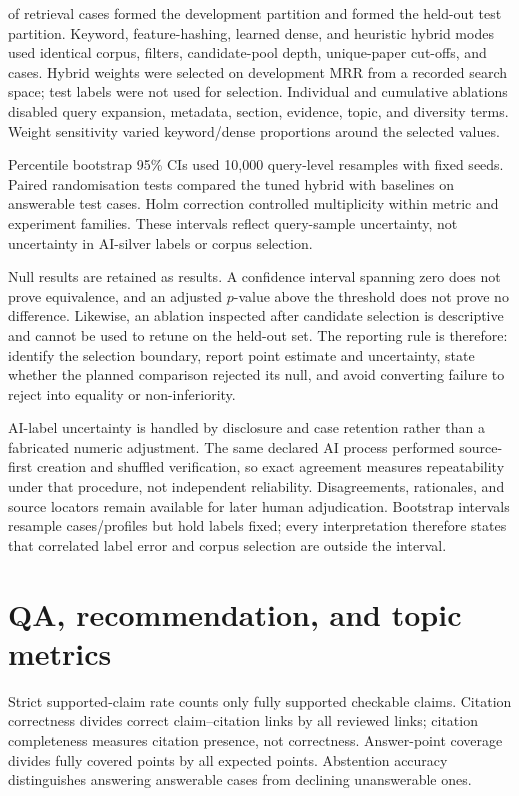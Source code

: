 \RetrievalDevCount{} of \RetrievalCaseCount{} retrieval cases formed the development partition and \RetrievalTestCount{} formed the held-out test partition. Keyword, feature-hashing, learned dense, and heuristic hybrid modes used identical corpus, filters, candidate-pool depth, unique-paper cut-offs, and cases. Hybrid weights were selected on development MRR from a recorded search space; test labels were not used for selection. Individual and cumulative ablations disabled query expansion, metadata, section, evidence, topic, and diversity terms. Weight sensitivity varied keyword/dense proportions around the selected values.

Percentile bootstrap 95\% CIs used 10,000 query-level resamples with fixed seeds. Paired randomisation tests compared the tuned hybrid with baselines on answerable test cases. Holm correction controlled multiplicity within metric and experiment families. These intervals reflect query-sample uncertainty, not uncertainty in AI-silver labels or corpus selection.

Null results are retained as results. A confidence interval spanning zero does not prove equivalence, and an adjusted $p$-value above the threshold does not prove no difference. Likewise, an ablation inspected after candidate selection is descriptive and cannot be used to retune on the held-out set. The reporting rule is therefore: identify the selection boundary, report point estimate and uncertainty, state whether the planned comparison rejected its null, and avoid converting failure to reject into equality or non-inferiority.

AI-label uncertainty is handled by disclosure and case retention rather than a fabricated numeric adjustment. The same declared AI process performed source-first creation and shuffled verification, so exact agreement measures repeatability under that procedure, not independent reliability. Disagreements, rationales, and source locators remain available for later human adjudication. Bootstrap intervals resample cases/profiles but hold labels fixed; every interpretation therefore states that correlated label error and corpus selection are outside the interval.

\section{QA, recommendation, and topic metrics}

Strict supported-claim rate counts only fully supported checkable claims. Citation correctness divides correct claim--citation links by all reviewed links; citation completeness measures citation presence, not correctness. Answer-point coverage divides fully covered points by all expected points. Abstention accuracy distinguishes answering answerable cases from declining unanswerable ones.

